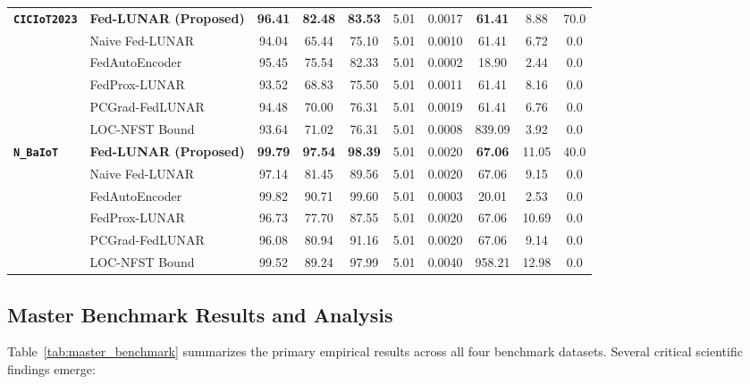 \begin{table}[t]
{\begin{tabular}{llcccccccc}
\midrule
\multirow{6}{*}{\textbf{\texttt{CICIoT2023}}} 
& \textbf{Fed-LUNAR (Proposed)} & \textbf{96.41} & \textbf{82.48} & \textbf{83.53} & 5.01 & 0.0017 & \textbf{61.41} & 8.88 & 70.0 \\
& Naive Fed-LUNAR & 94.04 & 65.44 & 75.10 & 5.01 & 0.0010 & 61.41 & 6.72 & 0.0 \\
& FedAutoEncoder & 95.45 & 75.54 & 82.33 & 5.01 & 0.0002 & 18.90 & 2.44 & 0.0 \\
& FedProx-LUNAR & 93.52 & 68.83 & 75.50 & 5.01 & 0.0011 & 61.41 & 8.16 & 0.0 \\
& PCGrad-FedLUNAR & 94.48 & 70.00 & 76.31 & 5.01 & 0.0019 & 61.41 & 6.76 & 0.0 \\
& LOC-NFST Bound & 93.64 & 71.02 & 76.31 & 5.01 & 0.0008 & 839.09 & 3.92 & 0.0 \\
\midrule
\multirow{6}{*}{\textbf{\texttt{N\_BaIoT}}} 
& \textbf{Fed-LUNAR (Proposed)} & \textbf{99.79} & \textbf{97.54} & \textbf{98.39} & 5.01 & 0.0020 & \textbf{67.06} & 11.05 & 40.0 \\
& Naive Fed-LUNAR & 97.14 & 81.45 & 89.56 & 5.01 & 0.0020 & 67.06 & 9.15 & 0.0 \\
& FedAutoEncoder & 99.82 & 90.71 & 99.60 & 5.01 & 0.0003 & 20.01 & 2.53 & 0.0 \\
& FedProx-LUNAR & 96.73 & 77.70 & 87.55 & 5.01 & 0.0020 & 67.06 & 10.69 & 0.0 \\
& PCGrad-FedLUNAR & 96.08 & 80.94 & 91.16 & 5.01 & 0.0020 & 67.06 & 9.14 & 0.0 \\
& LOC-NFST Bound & 99.52 & 89.24 & 97.99 & 5.01 & 0.0040 & 958.21 & 12.98 & 0.0 \\
\bottomrule
\end{tabular}
}
\end{table}

\subsection{Master Benchmark Results and Analysis}
\label{subsec:master_benchmark}

Table~\ref{tab:master_benchmark} summarizes the primary empirical results across all four benchmark datasets. Several critical scientific findings emerge:

